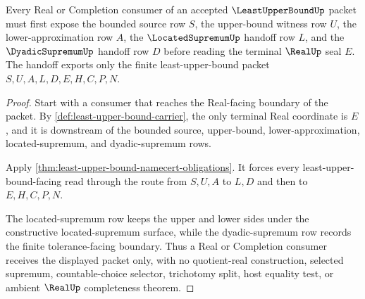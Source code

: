 \begin{theorem}
\label{thm:least-upper-bound-located-supremum-handoff}
Every Real or Completion consumer of an accepted $\LeastUpperBoundUp$ packet must first expose the bounded source row $S$, the upper-bound witness row $U$, the lower-approximation row $A$, the $\LocatedSupremumUp$ handoff row $L$, and the $\DyadicSupremumUp$ handoff row $D$ before reading the terminal $\RealUp$ seal $E$. The handoff exports only the finite least-upper-bound packet $S,U,A,L,D,E,H,C,P,N$.
\end{theorem}
\begin{proof}
Start with a consumer that reaches the Real-facing boundary of the packet. By \autoref{def:least-upper-bound-carrier}, the only terminal Real coordinate is $E$, and it is downstream of the bounded source, upper-bound, lower-approximation, located-supremum, and dyadic-supremum rows.

Apply \autoref{thm:least-upper-bound-namecert-obligations}. It forces every least-upper-bound-facing read through the route from $S,U,A$ to $L,D$ and then to $E,H,C,P,N$.

The located-supremum row keeps the upper and lower sides under the constructive located-supremum surface, while the dyadic-supremum row records the finite tolerance-facing boundary. Thus a Real or Completion consumer receives the displayed packet only, with no quotient-real construction, selected supremum, countable-choice selector, trichotomy split, host equality test, or ambient $\RealUp$ completeness theorem.
\end{proof}




